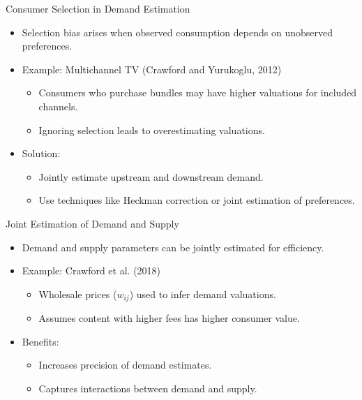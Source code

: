 \documentclass[aspectratio=169]{beamer}  %
\begin{document}
\begin{frame}{Consumer Selection in Demand Estimation}
    \begin{itemize}
        \item Selection bias arises when observed consumption depends on unobserved preferences.
        \item Example: Multichannel TV (Crawford and Yurukoglu, 2012)
        \begin{itemize}
            \item Consumers who purchase bundles may have higher valuations for included channels.
            \item Ignoring selection leads to overestimating valuations.
        \end{itemize}
        \item Solution:
        \begin{itemize}
            \item Jointly estimate upstream and downstream demand.
            \item Use techniques like Heckman correction or joint estimation of preferences.
        \end{itemize}
    \end{itemize}
\end{frame}

\begin{frame}{Joint Estimation of Demand and Supply}
    \begin{itemize}
        \item Demand and supply parameters can be jointly estimated for efficiency.
        \item Example: Crawford et al. (2018)
        \begin{itemize}
            \item Wholesale prices (\(w_{ij}\)) used to infer demand valuations.
            \item Assumes content with higher fees has higher consumer value.
        \end{itemize}
        \item Benefits:
        \begin{itemize}
            \item Increases precision of demand estimates.
            \item Captures interactions between demand and supply.
        \end{itemize}
    \end{itemize}
\end{frame}
\end{document}
